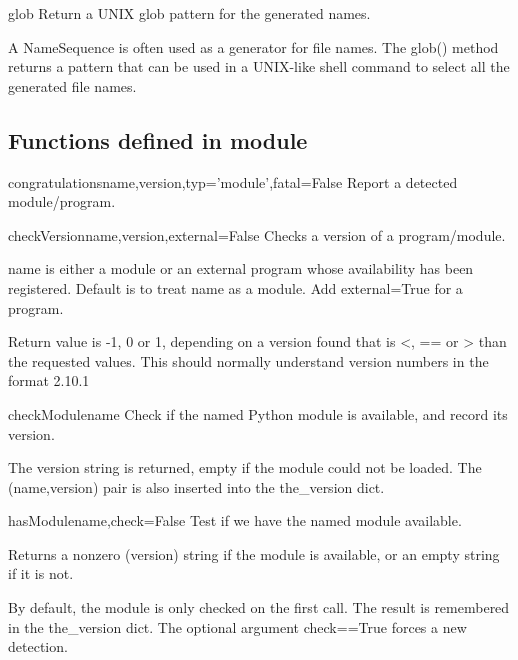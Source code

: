 \begin{funcdesc}{glob}{}
Return a UNIX glob pattern for the generated names.

        A NameSequence is often used as a generator for file names.
        The glob() method returns a pattern that can be used in a
        UNIX-like shell command to select all the generated file names.
        
\end{funcdesc}

\subsection{Functions defined in module }

\begin{funcdesc}{congratulations}{name,version,typ='module',fatal=False}
Report a detected module/program.
\end{funcdesc}

\begin{funcdesc}{checkVersion}{name,version,external=False}
Checks a version of a program/module.

    name is either a module or an external program whose availability has
    been registered.
    Default is to treat name as a module. Add external=True for a program.

    Return value is -1, 0 or 1, depending on a version found that is
    <, == or > than the requested values.
    This should normally understand version numbers in the format 2.10.1
    
\end{funcdesc}

\begin{funcdesc}{checkModule}{name}
Check if the named Python module is available, and record its version.

    The version string is returned, empty if the module could not be loaded.
    The (name,version) pair is also inserted into the the_version dict.
    
\end{funcdesc}

\begin{funcdesc}{hasModule}{name,check=False}
Test if we have the named module available.

    Returns a nonzero (version) string if the module is available,
    or an empty string if it is not.

    By default, the module is only checked on the first call. 
    The result is remembered in the the_version dict.
    The optional argument check==True forces a new detection.
    
\end{funcdesc}

